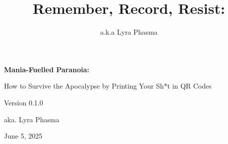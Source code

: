 \documentclass[12pt]{base} %
\title{Remember, Record, Resist:}     %
\author{a.k.a Lyra Phasma}                           %
\begin{document}



\frontmatter

\begin{romanpages}          %

\begin{titlepage}
  \centering
  \vspace*{\fill}
  {\HUGETITLE\bfseries Mania-Fuelled Paranoia: \par}
  \vspace{0.25em}
  {\HUGE How to Survive the Apocalypse by Printing Your Sh*t in QR Codes \par}
  \vspace{1.5em}
  {\Large Version 0.1.0\par}
  \vspace{2em}
  {\Large aka. Lyra Phasma\par}
  \vspace{1em}
  {\Large June 5, 2025\par}
  \vspace*{\fill}
\end{titlepage}

\tableofcontents            %
\listoffigures              %
\listoftables				%
\end{romanpages}            %

\mainmatter

\end{document}
